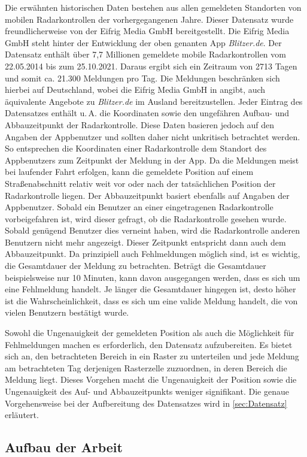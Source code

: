 Die erwähnten historischen Daten bestehen aus allen gemeldeten Standorten von mobilen Radarkontrollen der vorhergegangenen Jahre.
Dieser Datensatz wurde freundlicherweise von der Eifrig Media GmbH bereitgestellt.
Die Eifrig Media GmbH steht hinter der Entwicklung der oben genanten App \emph{Blitzer.de}.
Der Datensatz enthält über 7,7 Millionen gemeldete mobile Radarkontrollen vom 22.05.2014 bis zum 25.10.2021.
Daraus ergibt sich ein Zeitraum von 2713 Tagen und somit ca. 21.300 Meldungen pro Tag.
Die Meldungen beschränken sich hierbei auf Deutschland, wobei die Eifrig Media GmbH in \cite{AboutBlitzerDe} angibt, auch äquivalente Angebote zu \emph{Blitzer.de} im Ausland bereitzustellen.
Jeder Eintrag des Datensatzes enthält u.\,A. die Koordinaten sowie den ungefähren Aufbau- und Abbauzeitpunkt der Radarkontrolle.
Diese Daten basieren jedoch auf den Angaben der Appbenutzer und sollten daher nicht unkritisch betrachtet werden.
So entsprechen die Koordinaten einer Radarkontrolle dem Standort des Appbenutzers zum Zeitpunkt der Meldung in der App.
Da die Meldungen meist bei laufender Fahrt erfolgen, kann die gemeldete Position auf einem Straßenabschnitt relativ weit vor oder nach der tatsächlichen Position der Radarkontrolle liegen.
Der Abbauzeitpunkt basiert ebenfalls auf Angaben der Appbenutzer.
Sobald ein Benutzer an einer eingetragenen Radarkontrolle vorbeigefahren ist, wird dieser gefragt, ob die Radarkontrolle gesehen wurde.
Sobald genügend Benutzer dies verneint haben, wird die Radarkontrolle anderen Benutzern nicht mehr angezeigt.
Dieser Zeitpunkt entspricht dann auch dem Abbauzeitpunkt.
Da prinzipiell auch Fehlmeldungen möglich sind, ist es wichtig, die Gesamtdauer der Meldung zu betrachten.
Beträgt die Gesamtdauer beispielsweise nur 10 Minuten, kann davon ausgegangen werden, dass es sich um eine Fehlmeldung handelt.
Je länger die Gesamtdauer hingegen ist, desto höher ist die Wahrscheinlichkeit, dass es sich um eine valide Meldung handelt, die von vielen Benutzern bestätigt wurde.

Sowohl die Ungenauigkeit der gemeldeten Position als auch die Möglichkeit für Fehlmeldungen machen es erforderlich, den Datensatz aufzubereiten.
Es bietet sich an, den betrachteten Bereich in ein Raster zu unterteilen und jede Meldung am betrachteten Tag derjenigen Rasterzelle zuzuordnen, in deren Bereich die Meldung liegt.
Dieses Vorgehen macht die Ungenauigkeit der Position sowie die Ungenauigkeit des Auf- und Abbauzeitpunkts weniger signifikant.
Die genaue Vorgehensweise bei der Aufbereitung des Datensatzes wird in \autoref{sec:Datensatz} erläutert.

\subsection{Aufbau der Arbeit}
\label{sec:Aufbau}


